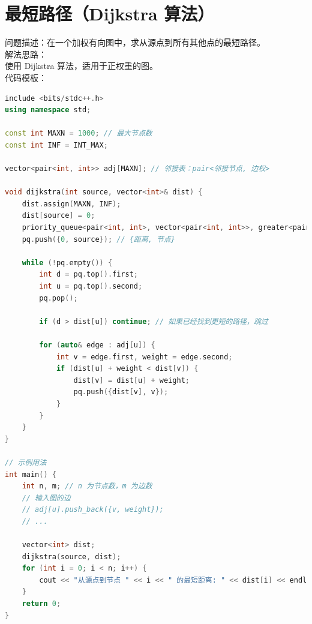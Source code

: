 \documentclass[12pt,twiside,a4paper]{ctexbook}
\numberwithin{chapter}{part}
\begin{document}
\section{最短路径（Dijkstra 算法）}
问题描述：在一个加权有向图中，求从源点到所有其他点的最短路径。\\
解法思路：\\
使用 Dijkstra 算法，适用于正权重的图。\\
代码模板：
\begin{lstlisting}[language=C++]
include <bits/stdc++.h>
using namespace std;

const int MAXN = 1000; // 最大节点数
const int INF = INT_MAX;

vector<pair<int, int>> adj[MAXN]; // 邻接表：pair<邻接节点, 边权>

void dijkstra(int source, vector<int>& dist) {
    dist.assign(MAXN, INF);
    dist[source] = 0;
    priority_queue<pair<int, int>, vector<pair<int, int>>, greater<pair<int, int>>> pq;
    pq.push({0, source}); // {距离, 节点}

    while (!pq.empty()) {
        int d = pq.top().first;
        int u = pq.top().second;
        pq.pop();

        if (d > dist[u]) continue; // 如果已经找到更短的路径，跳过

        for (auto& edge : adj[u]) {
            int v = edge.first, weight = edge.second;
            if (dist[u] + weight < dist[v]) {
                dist[v] = dist[u] + weight;
                pq.push({dist[v], v});
            }
        }
    }
}

// 示例用法
int main() {
    int n, m; // n 为节点数，m 为边数
    // 输入图的边
    // adj[u].push_back({v, weight});
    // ...
    
    vector<int> dist;
    dijkstra(source, dist);
    for (int i = 0; i < n; i++) {
        cout << "从源点到节点 " << i << " 的最短距离: " << dist[i] << endl;
    }
    return 0;
}
\end{lstlisting}
\end{document}
